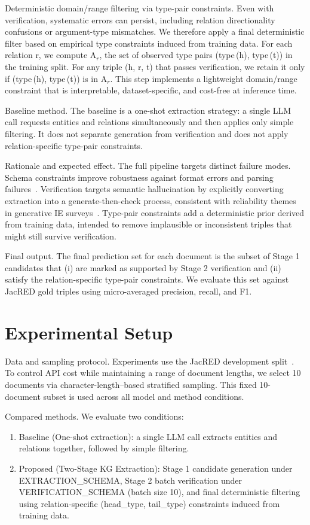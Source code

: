 \documentclass{article} %
\begin{document}
Deterministic domain/range filtering via type-pair constraints. Even with verification, systematic errors can persist, including relation directionality confusions or argument-type mismatches. We therefore apply a final deterministic filter based on empirical type constraints induced from training data. For each relation r, we compute A$_r$, the set of observed type pairs (type\,(h), type\,(t)) in the training split. For any triple (h, r, t) that passes verification, we retain it only if (type\,(h), type\,(t)) is in A$_r$. This step implements a lightweight domain/range constraint that is interpretable, dataset-specific, and cost-free at inference time.

Baseline method. The baseline is a one-shot extraction strategy: a single LLM call requests entities and relations simultaneously and then applies only simple filtering. It does not separate generation from verification and does not apply relation-specific type-pair constraints.

Rationale and expected effect. The full pipeline targets distinct failure modes. Schema constraints improve robustness against format errors and parsing failures~\cite{geng-2025-generating}. Verification targets semantic hallucination by explicitly converting extraction into a generate-then-check process, consistent with reliability themes in generative IE surveys~\cite{xu-2023-large}. Type-pair constraints add a deterministic prior derived from training data, intended to remove implausible or inconsistent triples that might still survive verification.

Final output. The final prediction set for each document is the subset of Stage 1 candidates that (i) are marked as supported by Stage 2 verification and (ii) satisfy the relation-specific type-pair constraints. We evaluate this set against JacRED gold triples using micro-averaged precision, recall, and F1.

\section{Experimental Setup}\label{sec:experimental}
Data and sampling protocol. Experiments use the JacRED development split~\cite{ma-2024-building}. To control API cost while maintaining a range of document lengths, we select 10 documents via character-length–based stratified sampling. This fixed 10-document subset is used across all model and method conditions.

Compared methods. We evaluate two conditions:
\begin{enumerate}
\item Baseline (One-shot extraction): a single LLM call extracts entities and relations together, followed by simple filtering.
\item Proposed (Two-Stage KG Extraction): Stage 1 candidate generation under EXTRACTION\_SCHEMA, Stage 2 batch verification under VERIFICATION\_SCHEMA (batch size 10), and final deterministic filtering using relation-specific (head\_type, tail\_type) constraints induced from training data.
\end{enumerate}
\end{document}
